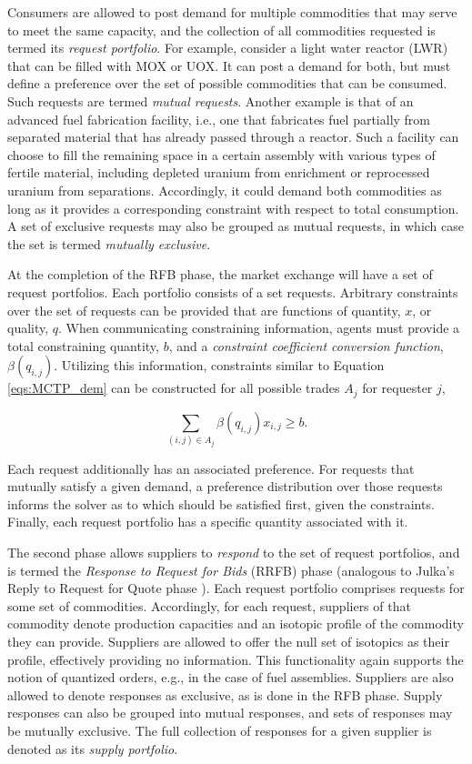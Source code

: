 Consumers are allowed to post demand for multiple commodities that may serve to
meet the same capacity, and the collection of all commodities requested is
termed its \textit{request portfolio}. For example, consider a light
water reactor (LWR) that can be
filled with MOX or UOX. It can post a demand for both, but must define a
preference over the set of possible commodities that can be consumed. Such
requests are termed \textit{mutual requests}. Another example is that of an
advanced fuel fabrication facility, i.e., one that fabricates fuel partially
from separated material that has already passed through a reactor. Such a
facility can choose to fill the remaining space in a certain assembly with
various types of fertile material, including depleted uranium from enrichment or
reprocessed uranium from separations. Accordingly, it could demand both
commodities as long as it provides a corresponding constraint with respect to
total consumption. A set of exclusive requests may also be grouped as mutual
requests, in which case the set is termed \textit{mutually exclusive}.

At the completion of the RFB phase, the market exchange will have a set of
request portfolios. Each portfolio consists of a set requests. Arbitrary
constraints over the set of requests can be provided that are functions of
quantity, $x$, or quality, $q$.  When communicating constraining information,
agents must provide a total constraining quantity, $b$, and a \textit{constraint
  coefficient conversion function}, $\beta (q_{i, j})$. Utilizing this
information, constraints similar to Equation \ref{eqs:MCTP_dem} can be
constructed for all possible trades $A_j$ for requester $j$,

\begin{equation}\label{meth:constr}
  \sum_{(i, j) \in A_j} \beta (q_{i,j}) x_{i, j} \geq b.
\end{equation}

\noindent
Each request additionally has an associated preference. For requests that
mutually satisfy a given demand, a preference distribution over those requests
informs the solver as to which should be satisfied first, given the
constraints. Finally, each request portfolio has a specific quantity associated
with it.

The second phase allows suppliers to \textit{respond} to the set of request
portfolios, and is termed the \textit{Response to Request for Bids} (RRFB) phase
(analogous to Julka's Reply to Request for Quote phase
\cite{julka_agent-based_2002}). Each request portfolio comprises requests
for some set of commodities. Accordingly, for each request, suppliers of that
commodity denote production capacities and an isotopic profile of the commodity
they can provide. Suppliers are allowed to offer the null set of isotopics as
their profile, effectively providing no information. 
This functionality again supports the notion of quantized orders,
e.g., in the case of fuel assemblies. 
Suppliers are also allowed
to denote responses as exclusive, as is done in the RFB phase. Supply responses
can also be grouped into mutual responses, and sets of responses may be mutually
exclusive. The full collection of responses for a
given supplier is denoted as its \textit{supply portfolio}.

